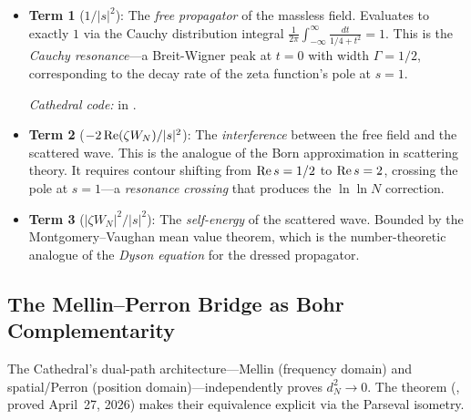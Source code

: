 \documentclass[11pt,a4paper]{article}
\begin{document}
\begin{correspondence}
\begin{itemize}
  \item \textbf{Term 1} ($1/|s|^2$): The \emph{free propagator} of the
    massless field. Evaluates to exactly $1$ via the Cauchy distribution
    integral $\frac{1}{2\pi}\int_{-\infty}^\infty \frac{dt}{1/4+t^2} = 1$.
    This is the \emph{Cauchy resonance}---a Breit-Wigner peak at $t=0$
    with width $\Gamma = 1/2$, corresponding to the decay rate of
    the zeta function's pole at $s=1$.

    \emph{Cathedral code:}  in .

  \item \textbf{Term 2} ($-2\operatorname{Re}(\zeta W_N)/|s|^2$): The \emph{interference}
    between the free field and the scattered wave. This is the analogue of
    the Born approximation in scattering theory. It requires contour shifting
    from $\operatorname{Re} s = 1/2$ to $\operatorname{Re} s = 2$, crossing the pole at $s=1$---a
    \emph{resonance crossing} that produces the $\ln\ln N$ correction.

  \item \textbf{Term 3} ($|\zeta W_N|^2/|s|^2$): The \emph{self-energy}
    of the scattered wave. Bounded by the Montgomery--Vaughan mean value
    theorem, which is the number-theoretic analogue of the \emph{Dyson
    equation} for the dressed propagator.
\end{itemize}
\end{correspondence}

\subsection{The Mellin--Perron Bridge as Bohr Complementarity}

The Cathedral's dual-path architecture---Mellin (frequency domain) and
spatial/Perron (position domain)---independently proves $d_N^2 \to 0$.
The theorem 
(, proved April~27, 2026) makes their
equivalence explicit via the Parseval isometry.
\end{document}
